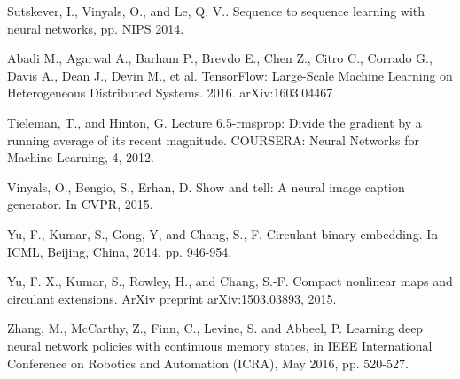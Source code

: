 \documentclass[a4paper,11pt]{article}
\begin{document}
\begin{thebibliography}{1}
 Sutskever, I., Vinyals, O., and Le, Q. V.. Sequence to sequence learning with neural networks, pp. NIPS 2014.


  Abadi M., Agarwal A., Barham P., Brevdo E., Chen Z., Citro C., Corrado G., Davis A., Dean J., Devin M., et al. TensorFlow: Large-Scale Machine Learning on Heterogeneous Distributed Systems. 2016. arXiv:1603.04467



 Tieleman, T., and Hinton, G.   Lecture 6.5-rmsprop:  Divide the gradient by a running average of its recent magnitude. COURSERA: Neural Networks for Machine Learning, 4, 2012.


 Vinyals, O., Bengio, S., Erhan, D. Show and tell: A neural image caption generator. In CVPR, 2015.




 Yu, F.,  Kumar, S., Gong, Y, and Chang, S.,-F.  Circulant binary embedding. In ICML, Beijing, China, 2014, pp. 946-954.

  Yu, F.  X.,  Kumar, S.,   Rowley, H.,  and  Chang, S.-F. Compact nonlinear maps and circulant extensions. ArXiv preprint arXiv:1503.03893, 2015.



 Zhang, M., McCarthy, Z., Finn, C., Levine, S. and Abbeel, P. Learning deep neural network policies with continuous memory states, in IEEE International Conference on Robotics and Automation (ICRA), May 2016, pp. 520-527.




\end{thebibliography}
\end{document}

